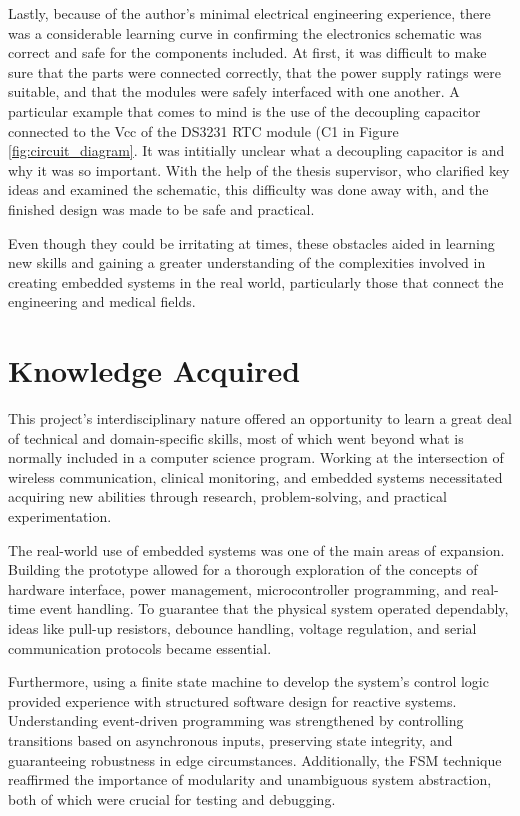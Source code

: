 Lastly, because of the author's minimal electrical engineering experience, there was a considerable learning curve in confirming the electronics schematic was correct and safe for the components included. At first, it was difficult to make sure that the parts were connected correctly, that the power supply ratings were suitable, and that the modules were safely interfaced with one another. A particular example that comes to mind is the use of the decoupling capacitor connected to the Vcc of the DS3231 RTC module (C1 in Figure \ref{fig:circuit_diagram}. It was intitially unclear what a decoupling capacitor is and why it was so important. With the help of the thesis supervisor, who clarified key ideas and examined the schematic, this difficulty was done away with, and the finished design was made to be safe and practical.

Even though they could be irritating at times, these obstacles aided in learning new skills and gaining a greater understanding of the complexities involved in creating embedded systems in the real world, particularly those that connect the engineering and medical fields.

\section{Knowledge Acquired}
This project's interdisciplinary nature offered an opportunity to learn a great deal of technical and domain-specific skills, most of which went beyond what is normally included in a computer science program. Working at the intersection of wireless communication, clinical monitoring, and embedded systems necessitated acquiring new abilities through research, problem-solving, and practical experimentation.

The real-world use of embedded systems was one of the main areas of expansion. Building the prototype allowed for a thorough exploration of the concepts of hardware interface, power management, microcontroller programming, and real-time event handling. To guarantee that the physical system operated dependably, ideas like pull-up resistors, debounce handling, voltage regulation, and serial communication protocols became essential.

Furthermore, using a finite state machine to develop the system's control logic provided experience with structured software design for reactive systems. Understanding event-driven programming was strengthened by controlling transitions based on asynchronous inputs, preserving state integrity, and guaranteeing robustness in edge circumstances. Additionally, the FSM technique reaffirmed the importance of modularity and unambiguous system abstraction, both of which were crucial for testing and debugging.

